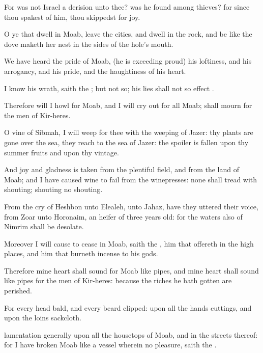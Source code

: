 {For was not
Israel a
derision unto thee? was he
found among
thieves? for
since thou
spakest of him, thou
skippedst for joy.

O ye that
dwell in
Moab,
leave the
cities, and
dwell in the
rock, and be like the
dove
{} maketh her
nest in the
sides of the
hole’s
mouth.

We have
heard the
pride of
Moab, (he is
exceeding
proud) his
loftiness, and his
arrogancy, and his
pride, and the
haughtiness of his
heart.

I
know his
wrath,
saith the
{}; but
{} not
{} so; his
lies shall not so
effect
{}.

Therefore will I
howl for
Moab, and I will cry
out for all
Moab;
{} shall
mourn for the
men of
Kir-heres.

O
vine of
Sibmah, I will
weep for thee with the
weeping of
Jazer: thy
plants are gone
over the
sea, they
reach
{} to the
sea of
Jazer: the
spoiler is
fallen upon thy summer
fruits and upon thy
vintage.

And
joy and
gladness is
taken from the plentiful
field, and from the
land of
Moab; and I have caused
wine to
fail from the
winepresses: none shall
tread with
shouting;
{}
shouting
{} no
shouting.

From the
cry of
Heshbon
{} unto
Elealeh,
{} unto
Jahaz, have they
uttered their
voice, from
Zoar
{} unto
Horonaim,
{} an
heifer of three years
old: for the
waters also of
Nimrim shall be
desolate.

Moreover I will cause to
cease in
Moab,
saith the
{}, him that
offereth in the high
places, and him that burneth
incense to his
gods.

Therefore mine
heart shall
sound for
Moab like
pipes, and mine
heart shall
sound like
pipes for the
men of
Kir-heres: because the
riches
{} he hath
gotten are
perished.

For every
head
{}
bald, and every
beard
clipped: upon all the
hands
{}
cuttings, and upon the
loins
sackcloth.

lamentation generally upon all the
housetops of
Moab, and in the
streets thereof: for I have
broken
Moab like a
vessel wherein
{} no
pleasure,
saith the
{}.

}
